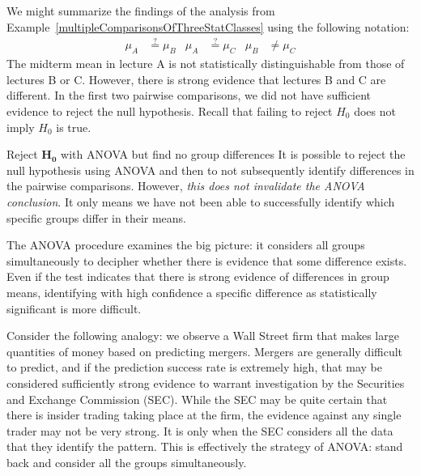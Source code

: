We might summarize the findings of the analysis from Example~\ref{multipleComparisonsOfThreeStatClasses} using the following notation:
\begin{align*}
\mu_A &\stackrel{?}{=} \mu_B
	&\mu_A &\stackrel{?}{=} \mu_C
	&\mu_B &\neq \mu_C
\end{align*}
The midterm mean in lecture A is not statistically distinguishable from those of lectures B or C. However, there is strong evidence that lectures B and C are different. In the first two pairwise comparisons, we did not have sufficient evidence to reject the null hypothesis. Recall that failing to reject $H_0$ does not imply $H_0$ is true.

\begin{onebox}{Reject $\mathbf{H_0}$ with ANOVA
    but find no group differences}
  It is possible to reject the null hypothesis using ANOVA
  and then to not subsequently identify differences in the
  pairwise comparisons.
  However, \emph{this does not invalidate the ANOVA conclusion}.
  It only means we have not been able to successfully identify
  which specific groups differ in their means.
\end{onebox}

The ANOVA procedure examines the big picture: it considers all groups simultaneously to decipher whether there is evidence that some difference exists. Even if the test indicates that there is strong evidence of differences in group means, identifying with high confidence a specific difference as statistically significant is more difficult.

Consider the following analogy: we observe a Wall Street firm that makes large quantities of money based on predicting mergers. Mergers are generally difficult to predict, and if the prediction success rate is extremely high, that may be considered sufficiently strong evidence to warrant investigation by the Securities and Exchange Commission (SEC). While the SEC may be quite certain that there is insider trading taking place at the firm, the evidence against any single trader may not be very strong. It is only when the SEC considers all the data that they identify the pattern. This is effectively the strategy of ANOVA: stand back and consider all the groups simultaneously.



